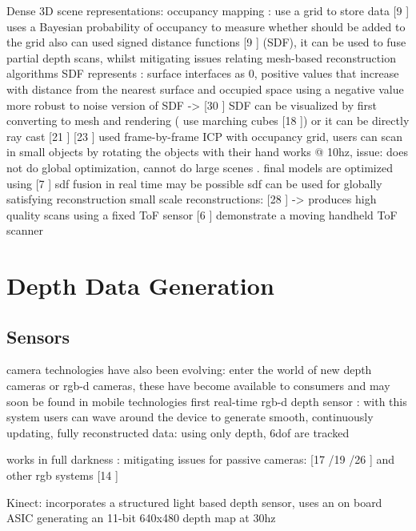 Dense 3D scene representations:
occupancy mapping : use a grid to store data
[9 \cite{Elfes87Sensor}] uses a Bayesian probability of occupancy to measure whether should be added to the grid
also can used signed distance functions [9 \cite{Elfes87Sensor}] (SDF), it can be used to fuse partial depth scans, whilst mitigating
issues relating mesh-based reconstruction algorithms
SDF represents : surface interfaces as 0, positive values that increase with distance from the nearest surface
and occupied space using a negative value
more robust to noise version of SDF -> [30 \cite{Zach07Globally} ]
SDF can be visualized by first converting to mesh and rendering ( use marching cubes [18 \cite{Cubes87High}]) or it can be directly ray cast [21 \cite{Parker98Interactive}]
[23 \cite{Rusinkiewicz02Real}] used frame-by-frame ICP with occupancy grid, users can scan in small objects by rotating the objects with their hand
works @ 10hz, issue: does not do global optimization, cannot do large scenes . final models are optimized using [7 \cite{Curless96Volumetric}]
sdf fusion in real time may be possible
sdf can be used for globally satisfying reconstruction
small scale reconstructions:
	[28 \cite{Weise09Hand}] -> produces high quality scans using a fixed ToF sensor
	[6 \cite{Cui103d} ] demonstrate a moving handheld ToF scanner



\section{Depth Data Generation}

\subsection{Sensors}

camera technologies have also been evolving: enter the world of new depth cameras or rgb-d cameras,
these have become available to consumers and may soon be found in mobile technologies \cite{Zhang12Microsoft}
first real-time rgb-d depth sensor : with this system users can wave around the device to generate smooth, continuously updating, fully reconstructed data: using only depth, 6dof are tracked

works in full darkness : mitigating issues for passive cameras: [17 \cite{Klein07Parallel} /19 \cite{Newcombe10Live} /26 \cite{Stuhmer10Real}] and other rgb systems [14 \cite{Henry10Rgb}]

Kinect: incorporates a structured light based depth sensor, uses an on board ASIC generating an 11-bit 640x480 depth map at 30hz

